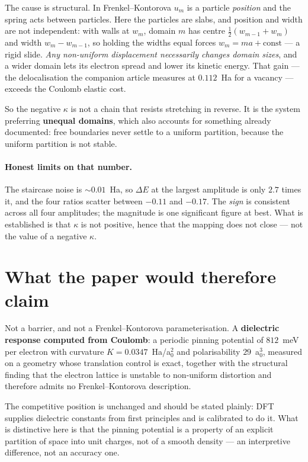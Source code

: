\documentclass[11pt]{article}
\newcommand{\half}{\tfrac12}
\begin{document}
The cause is structural. In Frenkel--Kontorova $u_m$ is a particle \emph{position} and the spring
acts between particles. Here the particles are slabs, and position and width are not independent:
with walls at $w_m$, domain $m$ has centre $\half(w_{m-1}+w_m)$ and width $w_m-w_{m-1}$, so holding
the widths equal forces $w_m=ma+\mathrm{const}$ --- a rigid slide. \emph{Any non-uniform
displacement necessarily changes domain sizes}, and a wider domain lets its electron spread and
lower its kinetic energy. That gain --- the delocalisation the companion article measures at
$0.112$~Ha for a vacancy --- exceeds the Coulomb elastic cost.

So the negative $\kappa$ is not a chain that resists stretching in reverse. It is the system
preferring \textbf{unequal domains}, which also accounts for something already documented: free
boundaries never settle to a uniform partition, because the uniform partition is not stable.

\paragraph{Honest limits on that number.} The staircase noise is $\sim0.01$~Ha, so $\Delta E$ at the
largest amplitude is only $2.7$ times it, and the four ratios scatter between $-0.11$ and $-0.17$.
The \emph{sign} is consistent across all four amplitudes; the magnitude is one significant figure at
best. What is established is that $\kappa$ is not positive, hence that the mapping does not close ---
not the value of a negative $\kappa$.

\section*{What the paper would therefore claim}

Not a barrier, and not a Frenkel--Kontorova parameterisation. A \textbf{dielectric response computed
from Coulomb}: a periodic pinning potential of $812$~meV per electron with curvature
$K=0.0347$~Ha/a$_0^2$ and polarisability $29$~a$_0^3$, measured on a geometry whose translation
control is exact, together with the structural finding that the electron lattice is unstable to
non-uniform distortion and therefore admits no Frenkel--Kontorova description.

The competitive position is unchanged and should be stated plainly: DFT supplies dielectric
constants from first principles and is calibrated to do it. What is distinctive here is that the
pinning potential is a property of an explicit partition of space into unit charges, not of a smooth
density --- an interpretive difference, not an accuracy one.
\end{document}
